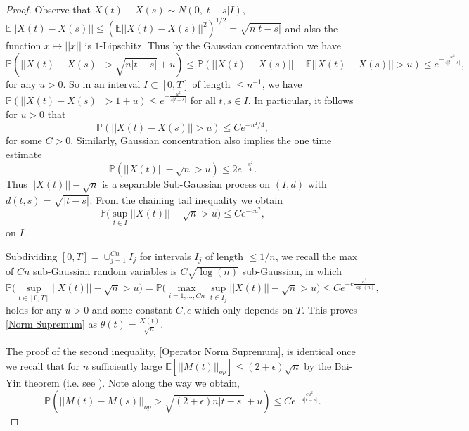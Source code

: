\documentclass{amsart}
\numberwithin{equation}{section}
\newcommand{\E}{\mathbb{E}}
\newcommand{\pr}{\mathbb{P}}
\begin{document}
\begin{proof}


Observe that $X(t)-X(s) \sim N(0,|t-s|I)$,  $\E||X(t)-X(s)||\leq (\E||X(t)-X(s)||^2)^{1/2}=\sqrt{n|t-s|}$ and also the function $x\mapsto ||x||$ is $1$-Lipschitz. Thus by the Gaussian concentration \cite{Ha16} we have
\begin{equation*}
    \pr(||X(t)-X(s)||>\sqrt{n|t-s|}+u)\leq \pr(||X(t)-X(s)||-\E||X(t)-X(s)||>u) \leq e^{-\frac{u^2}{4|t-s|}},
\end{equation*}
for any $u>0$. So in an interval $I \subset [0,T]$ of length $\leq n^{-1}$, we have $\pr(||X(t)-X(s)||>1+u)\leq e^{-\frac{u^2}{4|t-s|}}$ for all $t,s \in I$. In particular, it follows for $u>0$ that
\begin{equation}\label{Norm Continuity}
    \pr(||X(t)-X(s)||>u)\leq C e^{-u^2/4},
\end{equation}
for some $C>0$. Similarly, Gaussian concentration also implies the one time estimate
\begin{equation*}
    \pr(||X(t)||-\sqrt{n}>u)\leq 2 e^{-\frac{u^2}{4}}.
\end{equation*}
Thus $||X(t)||-\sqrt{n}$ is a separable Sub-Gaussian process on $(I,d)$ with $d(t,s)=\sqrt{|t-s|}$. From the chaining tail inequality \cite[Thm 5.29]{Ha16} we obtain
\begin{equation}
    \pr\bigg(\sup_{t \in I} ||X(t)||-\sqrt{n}>u\bigg) \leq Ce^{-c u^2}, 
\end{equation}
on $I$. 

Subdividing $[0,T] = \cup_{j=1}^{Cn} I_j$ for intervals $I_j$ of length $\leq 1/n$, we recall the max of $Cn$ sub-Gaussian random variables is $C\sqrt{\log(n)}$ sub-Gaussian, in which
\begin{equation*}
    \pr\bigg(\sup_{t \in [0,T]} ||X(t)||-\sqrt{n}>u\bigg) =\pr\bigg(\max_{i=1,\dots,Cn}\sup_{t \in I_j} ||X(t)||-\sqrt{n}>u\bigg)\leq Ce^{-c \frac{u^2}{\log(n)}},
\end{equation*}
holds for any $u>0$ and some constant $C,c$ which only depends on $T$. This proves \eqref{Norm Supremum} as $\theta(t)=\frac{X(t)}{\sqrt{n}}$.

The proof of the second inequality, \eqref{Operator Norm Supremum}, is identical once we recall that for $n$ sufficiently large $\E[||M(t)||_{op}] \leq (2+\epsilon)\sqrt{n}$ by the Bai-Yin theorem (i.e. see \cite{Anderson_Guionnet_Zeitouni_2009}). Note along the way we obtain,
\begin{equation}\label{Operator Norm Continuity}
    \pr(||M(t)-M(s)||_{op}>\sqrt{(2+\epsilon)n|t-s|}+u)\leq C e^{-\frac{cu^2}{4|t-s|}}.
\end{equation}


\end{proof}
\end{document}
